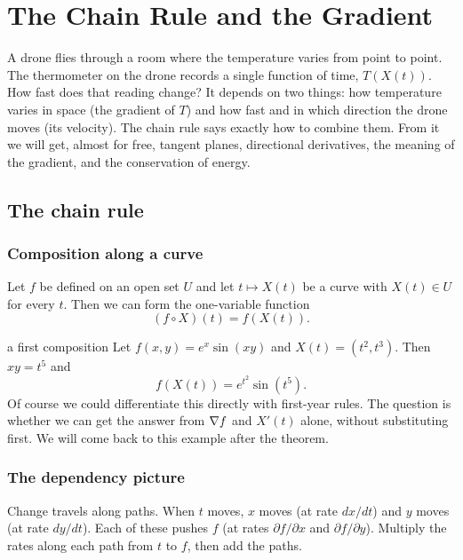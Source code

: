 \clearpage
{}\renewcommand{\tabname}{II}
\chapter{The Chain Rule and the Gradient}\label{ch:chain}

A drone flies through a room where the temperature varies from point to point. The
thermometer on the drone records a single function of time, $T(X(t))$. How fast does that
reading change? It depends on two things: how temperature varies in space (the gradient
of $T$) and how fast and in which direction the drone moves (its velocity). The chain
rule says exactly how to combine them. From it we will get, almost for free, tangent
planes, directional derivatives, the meaning of the gradient, and the conservation of
energy.

\section{The chain rule}

\subsection{Composition along a curve}

Let $f$ be defined on an open set $U$ and let $t\mapsto X(t)$ be a curve with $X(t)\in U$
for every $t$. Then we can form the one-variable function
\[ (f\circ X)(t)=f(X(t)). \]

\begin{example}{a first composition}
Let $f(x,y)=e^x\sin(xy)$ and $X(t)=(t^2,t^3)$. Then $xy=t^5$ and
\[ f(X(t))=e^{t^2}\sin(t^5). \]
Of course we could differentiate this directly with first-year rules. The question is
whether we can get the answer from $\nabla f$ and $X'(t)$ alone, without substituting
first. We will come back to this example after the theorem.
\end{example}

\subsection{The dependency picture}

\begin{intuition}
Change travels along paths. When $t$ moves, $x$ moves (at rate $dx/dt$) and $y$ moves
(at rate $dy/dt$). Each of these pushes $f$ (at rates $\partial f/\partial x$ and
$\partial f/\partial y$). Multiply the rates along each path from $t$ to $f$, then add
the paths.
\end{intuition}

